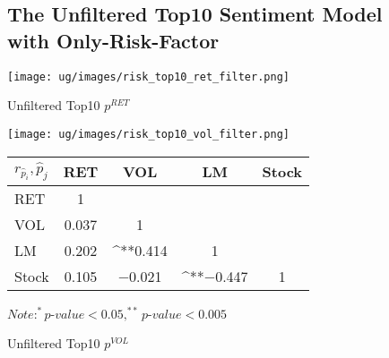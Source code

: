 \documentclass[logo,bsc,singlespacing,parskip]{infthesis}
\begin{document}
\begin{figure}[ht]
\subsection{The Unfiltered Top10 Sentiment Model with Only-Risk-Factor}
\label{appendix_risk_top10}
\begin{minipage}{0.90\textwidth}
  \centering
  \begin{minipage}{0.5\textwidth}
    \centering
    \texttt{[image: ug/images/risk\_top10\_ret\_filter.png]}
    \caption{\small Unfiltered Top10 ${p}^{RET}$}
    \label{fig:risk_top10_ret_unfiltered}
  \end{minipage}%
  \begin{minipage}{0.5\textwidth}
    \centering
    \texttt{[image: ug/images/risk\_top10\_vol\_filter.png]} 
    \caption{\small Unfiltered Top10 ${p}^{VOL}$}
    \label{fig:risk_top10_vol_unfiltered}
  \end{minipage}


    \begin{minipage}[t]{0.9\textwidth}
    \centering
    \begin{tabular}{lcccc}
    \label{tab:risk_top10_corr_unfiltered}
    $r_\hat{p}_i,\hat{p}_j$      & RET       & VOL       & LM        & Stock    \\ \hline
    RET    & 1  &  &  &  \\
    VOL    & 0.037   & 1  &  &  \\
    LM    & 0.202 & ^{**}0.414 & 1  &  \\
    Stock  &  0.105 & $-$0.021  & ^{**}$-$0.447 & 1  \\ \hline
    \end{tabular}
    \medskip
    $\textit{Note}: ^{*}p$-$value<0.05, ^{**}p$-$value<0.005$
    \end{minipage}

\end{minipage}
\end{figure}
\end{document}

